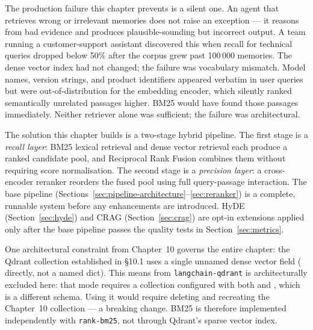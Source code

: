 

The production failure this chapter prevents is a silent one. An agent that
retrieves wrong or irrelevant memories does not raise an exception --- it
reasons from bad evidence and produces plausible-sounding but incorrect
output. A team running a customer-support assistant discovered this when
recall for technical queries dropped below 50\% after the corpus grew past
100\,000 memories. The dense vector index had not changed; the failure was
vocabulary mismatch. Model names, version strings, and product identifiers
appeared verbatim in user queries but were out-of-distribution for the
embedding encoder, which silently ranked semantically unrelated passages
higher. BM25 would have found those passages immediately. Neither retriever
alone was sufficient; the failure was architectural.

The solution this chapter builds is a two-stage hybrid pipeline. The first
stage is a \emph{recall layer}: BM25 lexical retrieval and dense vector
retrieval each produce a ranked candidate pool, and Reciprocal Rank Fusion
combines them without requiring score normalisation. The second stage is a
\emph{precision layer}: a  cross-encoder reranker reorders
the fused pool using full query-passage interaction. The base pipeline
(Sections~\ref{sec:pipeline-architecture}--\ref{sec:reranker}) is a complete,
runnable system before any enhancements are introduced. HyDE
(Section~\ref{sec:hyde}) and CRAG (Section~\ref{sec:crag}) are opt-in
extensions applied only after the base pipeline passes the quality tests in
Section~\ref{sec:metrics}.

One architectural constraint from Chapter~10 governs the entire chapter:
the Qdrant collection established in \S10.1 uses a single unnamed dense
vector field ( directly, not a named dict). This means  from
\texttt{langchain-qdrant} is architecturally excluded here: that mode requires
a collection configured with both  and
, which is a different schema. Using it would
require deleting and recreating the Chapter~10 collection --- a breaking change.
BM25 is therefore implemented independently with \texttt{rank-bm25}, not
through Qdrant's sparse vector index.

